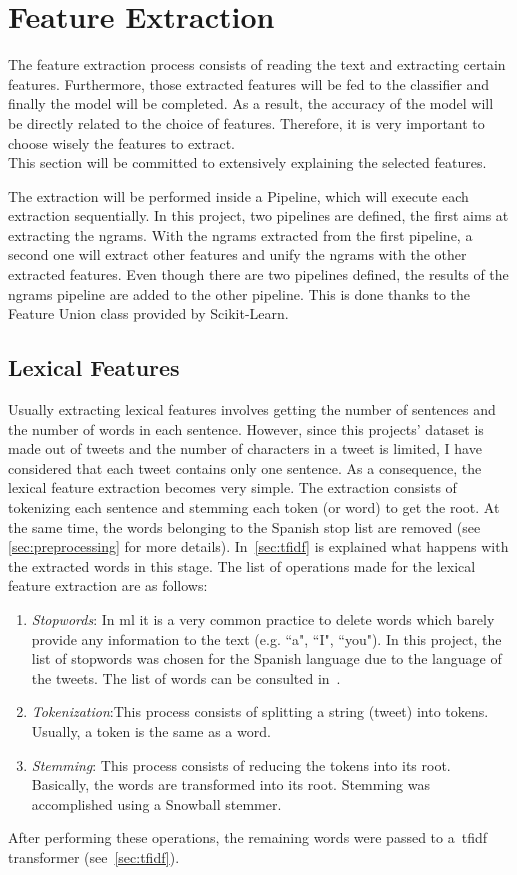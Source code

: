 \section{Feature Extraction}
\label{sec:feature}
The feature extraction process consists of reading the text and extracting certain features. Furthermore, those extracted features will be fed to the classifier and finally the model will be completed. As a result, the accuracy of the model will be directly related to the choice of features. Therefore, it is very important to choose wisely the features to extract.\\
This section will be committed to extensively explaining the selected features.
\par
The extraction will be performed inside a Pipeline, which will execute each extraction sequentially. In this project, two pipelines are defined, the first aims at extracting the ngrams. With the ngrams extracted from the first pipeline, a second one will extract other features and unify the ngrams with the other extracted features. Even though there are two pipelines defined, the results of the ngrams pipeline are added to the other pipeline. This is done thanks to the Feature Union class provided by Scikit-Learn.
\subsection{Lexical Features}
Usually extracting lexical features involves getting the number of sentences and the number of words in each sentence. However, since this projects' dataset is made out of tweets and the number of characters in a tweet is limited, I have considered that each tweet contains only one sentence. As a consequence, the lexical feature extraction becomes very simple. The extraction consists of tokenizing each sentence and stemming each token (or word) to get the root. At the same time, the words belonging to the Spanish stop list are removed (see \cref{sec:preprocessing} for more details). In~\cref{sec:tfidf} is explained what happens with the extracted words in this stage. The list of operations made for the lexical feature extraction are as follows:
\begin{enumerate}
	\item \textit{Stopwords}:  In \ac{ml} it is a very common practice to delete words which barely provide any information to the text (e.g. ``a", ``I", ``you"). In this project, the list of stopwords was chosen for the Spanish language due to the language of the tweets. The list of words can be consulted in~\cite{stopwords}.
	\item \textit{Tokenization}:This process consists of splitting a string (tweet) into tokens. Usually, a token is the same as a word.
	\item 
	\textit{Stemming}: This process consists of reducing the tokens into its root. Basically, the words are transformed into its root. Stemming was accomplished using a Snowball stemmer. 
\end{enumerate}
After performing these operations, the remaining words were passed to a~\acl{tfidf} transformer (see~\cref{sec:tfidf}).
